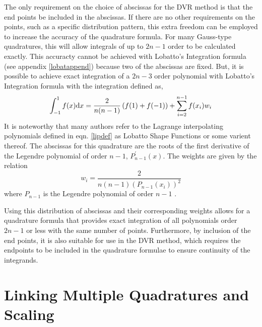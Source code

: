 \documentclass[preprint]{revtex4}
\newcommand{\dx}{{\rm d}x}
\begin{document}
The only requirement on the choice of abscissas for the DVR method is that the 
end points be included in the abscissas. If there are no other requirements on the 
points, such as a specific distribution pattern, this extra freedom can be employed
to increase the accuracy of the quadrature formula. For many Gauss-type quadratures, this
will allow integrals of up to $2n-1$ order to be calculated exactly. This accuracty
cannot be achieved with Lobatto's Integration formula (see appendix \ref{lobatappend})
because two of the abscissas are fixed. But, it is possible to achieve exact integration
of a $2n-3$ order polynomial with
Lobatto's Integration formula \cite{ABRW-STGN} with 
the integration defined as,
\begin{equation}
\label{lobatint}
\int_{-1}^1f(x)\dx=\frac{2}{n(n-1)}\left(f(1)+f(-1)\right)+\sum_{i=2}^{n-1}f(x_i)w_i
\end{equation}
It is noteworthy that many authors
refer to the Lagrange interpolating polynomials defined in eqn. \ref{lipdef} as Lobatto
Shape Functions or some varient thereof. \cite{Manolop_Wyatt_1988}
The abscissas for this quadrature are the roots of the first derivative
of the Legendre polynomial of order $n-1$, $P_{n-1}^\prime(x)$. The weights are
given by the relation
\begin{equation}
\label{lobatW}
w_i=\frac{2}{n(n-1)(P_{n-1}(x_i))^2}
\end{equation}
where $P_{n-1}$ is the Legendre polynomial of order $n-1$ \cite{ABRW-STGN}. 

Using this distribution of abscissas and their corresponding weights allows for
a quadrature formula that provides exact integration of all polynomials order $2n-1$
or less with the same number of points. Furthermore, by inclusion of the end points, 
it is also suitable for use in the DVR method, which requires the endpoints to be included
in the quadrature formulae to ensure continuity of the integrands. 

\section{Linking Multiple Quadratures and Scaling}
\end{document}
